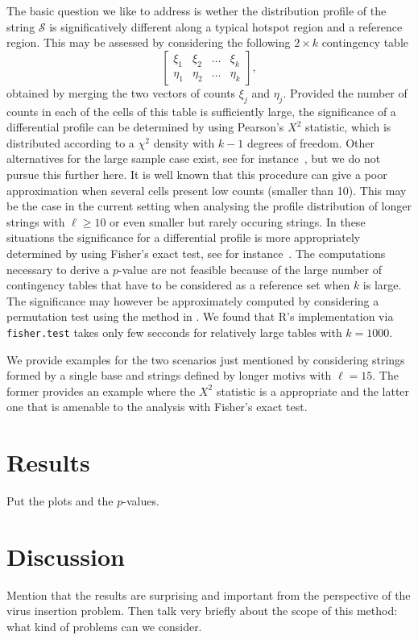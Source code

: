 \documentclass{bioinfo}
\begin{document}
The basic question we like to address is wether the distribution profile of the string $\mathcal S$ is significatively different along a typical hotspot region and a reference region. This may be assessed  by considering the following $2\times k$ contingency table
\[
  \begin{bmatrix}
  \xi_1 & \xi_2 & \ldots & \xi_k\\
  \eta_1 & \eta_2 & \ldots & \eta_k
  \end{bmatrix},
\]
obtained by merging the two vectors of counts $\xi_j$ and $\eta_j$. Provided the number of counts in each of the cells of this table is sufficiently large, the significance of a differential profile can be determined by using Pearson's $X^2$ statistic, which is distributed according to a $\chi^2$ density with $k-1$ degrees of freedom. Other alternatives for the large sample case exist, see for instance~\cite{RC}, but we do not pursue this further here.  It is well known that this procedure can give a poor approximation when several cells present low counts (smaller than 10). This may be the case in the current setting when analysing the profile distribution of longer strings with $\ell \geq 10$ or even smaller but rarely occuring strings. In these situations the significance for a differential profile is more appropriately determined by using Fisher's exact test, see for instance~\cite{A}. The computations necessary to derive a $p$-value are not feasible because of the large number of contingency tables that have to be considered as a reference set when $k$ is large. The significance may however be approximately computed by considering a permutation test using the method in \cite{P}. We found that R's implementation via \texttt{fisher.test} takes only few secconds for relatively large tables with $k=1000$.


We provide examples for the two scenarios just mentioned by considering strings formed by a single base and strings defined by longer motivs with $\ell = 15$. The former provides an example where the $X^2$ statistic is a appropriate and the latter one that is amenable to the analysis with Fisher's exact test.

\section{Results}
Put the plots and the $p$-values.

\section{Discussion}
Mention that the results are surprising and important from the perspective of  the virus insertion problem. Then talk very briefly about the scope of this method: what kind of problems can we consider.


\scriptsize{
   
\normalsize
}
\end{document}
